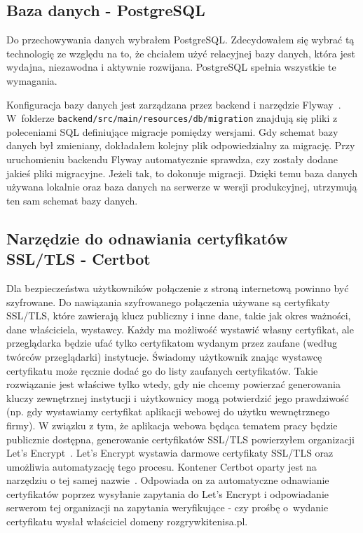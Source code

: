 \documentclass[shortabstract]{iithesis}
\begin{document}
\subsection{Baza danych - PostgreSQL}
Do przechowywania danych wybrałem PostgreSQL.
Zdecydowałem się wybrać tą technologię ze względu na to, że chciałem użyć relacyjnej bazy danych, która jest wydajna, niezawodna i aktywnie rozwijana. PostgreSQL spełnia wszystkie te wymagania.
\par
Konfiguracja bazy danych jest zarządzana przez backend i narzędzie Flyway~\cite{Flyway}.
W~folderze \texttt{backend/src/main/resources/db/migration} znajdują się pliki z poleceniami SQL definiujące migracje pomiędzy wersjami.
Gdy schemat bazy danych był zmieniany, dokładałem kolejny plik odpowiedzialny za migrację. Przy uruchomieniu backendu Flyway automatycznie sprawdza, czy zostały dodane jakieś pliki migracyjne.
Jeżeli tak, to dokonuje migracji.
Dzięki temu baza danych używana lokalnie oraz baza danych na serwerze w wersji produkcyjnej, utrzymują ten sam schemat bazy danych.

\subsection{Narzędzie do odnawiania certyfikatów SSL/TLS - Certbot}
Dla bezpieczeństwa użytkowników połączenie z stroną internetową powinno być szyfrowane.
Do nawiązania szyfrowanego połączenia używane są certyfikaty SSL/TLS, które zawierają klucz publiczny i inne dane, takie jak okres ważności, dane właściciela, wystawcy.
Każdy ma możliwość wystawić własny certyfikat, ale przeglądarka będzie ufać tylko certyfikatom wydanym przez zaufane (według twórców przeglądarki) instytucje.
Świadomy użytkownik znając wystawcę certyfikatu może ręcznie dodać go do listy zaufanych certyfikatów. Takie rozwiązanie jest właściwe tylko wtedy, gdy nie chcemy powierzać generowania kluczy zewnętrznej instytucji i użytkownicy mogą potwierdzić jego prawdziwość (np. gdy wystawiamy certyfikat aplikacji webowej do użytku wewnętrznego firmy).
W związku z tym, że aplikacja webowa będąca tematem pracy będzie publicznie dostępna, generowanie certyfikatów SSL/TLS powierzyłem organizacji Let's Encrypt~\cite{LetsEncrypt}.
Let's Encrypt wystawia darmowe certyfikaty SSL/TLS oraz umożliwia automatyzację tego procesu.
Kontener Certbot oparty jest na narzędziu o tej samej nazwie~\cite{Certbot}.
Odpowiada on za automatyczne odnawianie certyfikatów poprzez wysyłanie zapytania do Let's Encrypt i odpowiadanie serwerom tej organizacji na zapytania weryfikujące - czy prośbę o~wydanie certyfikatu wysłał właściciel domeny rozgrywkitenisa.pl.
\end{document}
